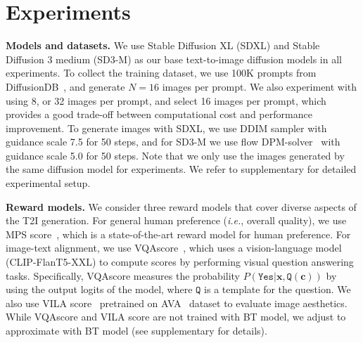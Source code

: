% 



% 
\section{Experiments}
\label{sec:experiment}





\vspace{0.05in}
\noindent
{\bf Models and datasets.}
We use Stable Diffusion XL (SDXL) \citep{podell2023sdxl} and Stable Diffusion 3 medium (SD3-M) \citep{esser2024scaling} as our base text-to-image diffusion models in all experiments. 
To collect the training dataset, we use 100K prompts from DiffusionDB~\citep{wang2022diffusiondb}, and generate $N=16$ images per prompt.
We also experiment with using 8, or 32 images per prompt, and select 16 images per prompt, which provides a good trade-off between computational cost and performance improvement.
To generate images with SDXL, we use DDIM \citep{song2020denoising} sampler with guidance scale 7.5 for 50 steps, and for SD3-M we use flow DPM-solver~\citep{lu2022dpm} with guidance scale 5.0 for 50 steps.
Note that we only use the images generated by the same diffusion model for experiments. We refer to supplementary for detailed experimental setup.

\vspace{1mm}
\noindent
{\bf Reward models.}
We consider three reward models that cover diverse aspects of the T2I generation. 
For general human preference (\emph{i.e.}, overall quality), we use MPS score~\citep{zhang2024learning}, which is a state-of-the-art reward model for human preference.
For image-text alignment, we use VQAscore~\citep{lin2025evaluating}, which uses a vision-language model (CLIP-FlanT5-XXL) to compute scores by performing visual question answering tasks. 
Specifically, VQAscore measures the probability $P(\texttt{Yes}|\mathbf{x}, \texttt{Q}(\mathbf{c}))$ by using the output logits of the model, where $\texttt{Q}$ is a template for the question. 
We also use VILA score~\citep{ke2023vila} pretrained on AVA~\cite{murray2012ava} dataset to evaluate image aesthetics.
While VQAscore and VILA score are not trained with BT model, we adjust to approximate with BT model (see supplementary for details).

